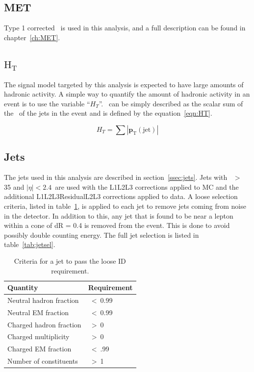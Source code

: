 \subsection{MET}
\label{ssec:MET}
Type 1 corrected \MET\ is used in this analysis, and a full description can be found in chapter~\ref{ch:MET}.

\subsection{\texorpdfstring{$\mathrm{H_{T}}$}{HT}}
\label{ssec:HT}

The signal model targeted by this analysis is expected to have large amounts of hadronic activity.
A simple way to quantify the amount of hadronic activity in an event is to use the variable ``$H_{T}$''.
\HT\ can be simply described as the scalar sum of the \pt\ of the jets in the event and is defined by the equation~\ref{eqn:HT}.

\begin{equation}
  \label{eqn:HT}
  H_{T} = \sum{\mathrm{|\mathbf{p}_{T}(jet)|}}
\end{equation}

\subsection{Jets}
\label{ssec:jetsel}

The jets used in this analysis are described in section~\ref{ssec:jets}.
Jets with \pt\ $>$ 35 \gev and  $|\eta| < 2.4$~are used
with the L1L2L3 corrections applied to MC and the additional L1L2L3ResidualL2L3 corrections applied to data.
A loose selection criteria, listed in table~\ref{tab:jetlooseid}, is applied to each jet to remove jets coming from noise in the detector.
In addition to this, any jet that is found to be near a lepton within a cone of dR = 0.4 is removed from the event.
This is done to avoid possibly double counting energy.
The full jet selection is listed in table~\ref{tab:jetsel}.

\begin{table}[htb]
  \begin{center}
    \caption{
      \label{tab:jetlooseid}
      Criteria for a jet to pass the loose ID requirement.
    }
    \begin{tabular}[width=0.4\textwidth]{l|l}
      \hline
      \hline
      Quantity & Requirement \\
      \hline
      Neutral hadron fraction &$~<~$0.99 \\
      Neutral EM fraction     &$~<~$0.99 \\
      Charged hadron fraction &$~>~$0    \\
      Charged multiplicity    &$~>~$0    \\
      Charged EM fraction     &$~<~$.99  \\
      Number of constituents  &$~>~$1    \\
      \hline
      \hline      
    \end{tabular}
  \end{center}
\end{table}

